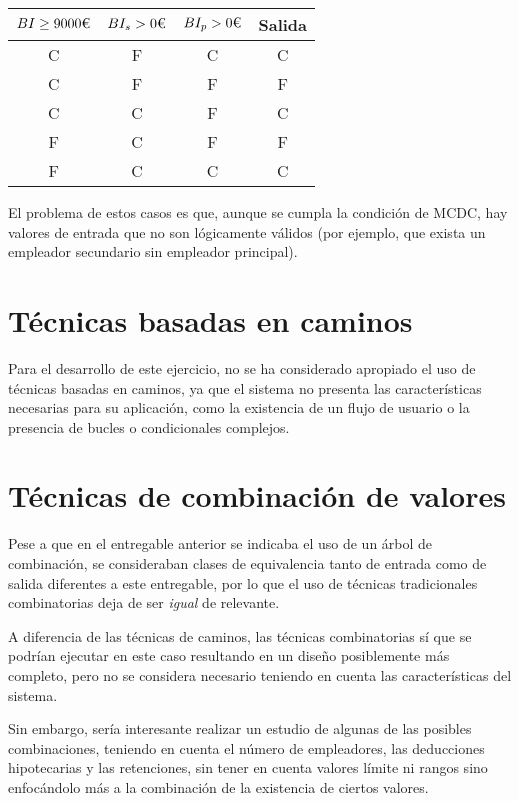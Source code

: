\begin{table}[H]
	\centering
	\begin{tabular}{|ccc|c|}
		\hline
		\rowcolor{gray!50}
		$BI\geq 9000\textup{€}$ & $BI_s > 0\textup{€}$ & $BI_{p} > 0\textup{€}$ & \textbf{Salida} \\
		\hline
		\hline
		C & F & C & C \\
		C & F & F & F \\
		C & C & F & C \\
		F & C & F & F \\
		F & C & C & C \\
		\hline
	\end{tabular}
\end{table}

El problema de estos casos es que, aunque se cumpla la condición de MCDC, hay valores de entrada
que no son lógicamente válidos (por ejemplo, que exista un empleador secundario sin empleador principal).

\section{Técnicas basadas en caminos}
Para el desarrollo de este ejercicio, no se ha considerado apropiado el uso de técnicas basadas
en caminos, ya que el sistema no presenta las características necesarias para su aplicación,
como la existencia de un flujo de usuario o la presencia de bucles o condicionales complejos.

\newpage{}
\section{Técnicas de combinación de valores}
Pese a que en el entregable anterior se indicaba el uso de un árbol de combinación, se consideraban
clases de equivalencia tanto de entrada como de salida diferentes a este entregable, por lo que
el uso de técnicas tradicionales combinatorias deja de ser \emph{igual} de relevante.

A diferencia de las técnicas de caminos, las técnicas combinatorias sí que se podrían ejecutar
en este caso resultando en un diseño posiblemente más completo, pero no se considera necesario
teniendo en cuenta las características del sistema.

Sin embargo, sería interesante realizar un estudio de algunas de las posibles combinaciones,
teniendo en cuenta el número de empleadores, las deducciones hipotecarias y las retenciones,
sin tener en cuenta valores límite ni rangos sino enfocándolo más a la combinación de la
existencia de ciertos valores.

